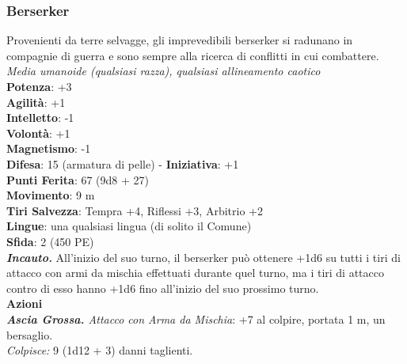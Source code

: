 \begin{multicols}{2}
\subsubsection{Berserker}

Provenienti da terre selvagge, gli imprevedibili berserker si radunano in compagnie di guerra e sono sempre alla ricerca di conflitti in cui combattere.\\
\emph{Media umanoide (qualsiasi razza), qualsiasi allineamento caotico}\\
\textbf{Potenza}: +3\\
\textbf{Agilità}: +1\\
\textbf{Intelletto}: -1\\
\textbf{Volontà}: +1\\
\textbf{Magnetismo}: -1\\
\textbf{Difesa}: 15 (armatura di pelle) - \textbf{Iniziativa}: +1\\
\textbf{Punti Ferita}: 67 (9d8 + 27)\\
\textbf{Movimento}: 9 m\\
\textbf{Tiri Salvezza}: Tempra +4, Riflessi +3, Arbitrio +2 \\
\textbf{Lingue}: una qualsiasi lingua (di solito il Comune)\\
\textbf{Sfida}: 2 (450 PE)\smallskip\\
\emph{\textbf{Incauto.}} All'inizio del suo turno, il berserker può ottenere +1d6 su tutti i tiri di attacco con armi da mischia effettuati durante quel turno, ma i tiri di attacco contro di esso hanno +1d6 fino all'inizio del suo prossimo turno.\\
\smallskip\textbf{Azioni} \\
\emph{\textbf{Ascia Grossa.} Attacco con Arma da Mischia}: +7 al colpire, portata 1 m, un bersaglio.\\
\emph{Colpisce:} 9 (1d12 + 3) danni taglienti. \\



\end{multicols}
